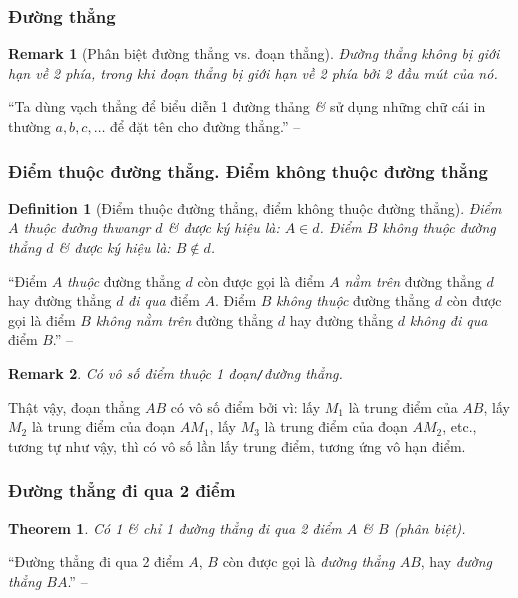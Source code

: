 \documentclass{article}
\numberwithin{equation}{section}
\newtheorem{definition}{Definition}[section]
\newtheorem{remark}{Remark}[section]
\newtheorem{theorem}{Theorem}[section]
\begin{document}
\subsubsection{Đường thẳng}

\begin{remark}[Phân biệt đường thẳng vs. đoạn thẳng]
	Đường thẳng không bị giới hạn về 2 phía, trong khi đoạn thẳng bị giới hạn về 2 phía bởi 2 đầu mút của nó.
\end{remark}
``Ta dùng vạch thẳng để biểu diễn 1 đường thảng \textit{\&} sử dụng những chữ cái in thường $a,b,c,\ldots$ để đặt tên cho đường thẳng.'' -- \cite[p. 76]{Thai_Anh_Dat_Ha_Loan_Nam_Quang_Toan_6_tap_2}

\subsubsection{Điểm thuộc đường thẳng. Điểm không thuộc đường thẳng}

\begin{definition}[Điểm thuộc đường thẳng, điểm không thuộc đường thẳng]
	Điểm $A$ \emph{thuộc} đường thwangr $d$ \textit{\&} được ký hiệu là: $A\in d$. Điểm $B$ \emph{không thuộc} đường thẳng $d$ \textit{\&} được ký hiệu là: $B\notin d$.
\end{definition}
``Điểm $A$ \textit{thuộc} đường thẳng $d$ còn được gọi là điểm $A$ \textit{nằm trên} đường  thẳng $d$ hay đường thẳng $d$ \textit{đi qua} điểm $A$. Điểm $B$ \textit{không thuộc} đường thẳng $d$ còn được gọi là điểm $B$ \textit{không nằm trên} đường thẳng $d$ hay đường thẳng $d$ \textit{không đi qua} điểm $B$.'' -- \cite[p. 76]{Thai_Anh_Dat_Ha_Loan_Nam_Quang_Toan_6_tap_2}

\begin{remark}
	Có vô số điểm thuộc 1 đoạn\texttt{/}đường thẳng.
\end{remark}
Thật vậy, đoạn thẳng $AB$ có vô số điểm bởi vì: lấy $M_1$ là trung điểm của $AB$, lấy $M_2$ là trung điểm của đoạn $AM_1$, lấy $M_3$ là trung điểm của đoạn $AM_2$, etc., tương tự như vậy, thì có vô số lần lấy trung điểm, tương ứng vô hạn điểm.

\subsubsection{Đường thẳng đi qua 2 điểm}

\begin{theorem}
	Có 1 \textit{\&} chỉ 1 đường thẳng đi qua 2 điểm $A$ \textit{\&} $B$ (phân biệt).
\end{theorem}
``Đường thẳng đi qua 2 điểm $A$, $B$ còn được gọi là \textit{đường thẳng $AB$}, hay \textit{đường thẳng $BA$}.'' -- \cite[p. 77]{Thai_Anh_Dat_Ha_Loan_Nam_Quang_Toan_6_tap_2}
\end{document}
